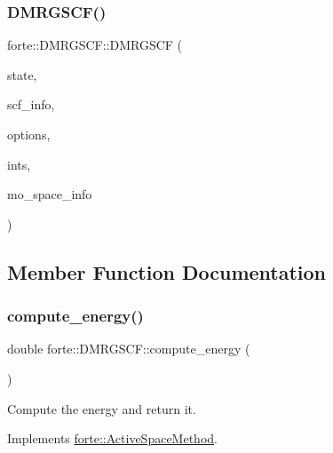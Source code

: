 \subsubsection{\texorpdfstring{D\+M\+R\+G\+S\+C\+F()}{DMRGSCF()}}
{\footnotesize\ttfamily forte\+::\+D\+M\+R\+G\+S\+C\+F\+::\+D\+M\+R\+G\+S\+CF (\begin{DoxyParamCaption}\item[{\mbox{\hyperlink{classforte_1_1_state_info}{State\+Info}}}]{state,  }\item[{std\+::shared\+\_\+ptr$<$ \mbox{\hyperlink{classforte_1_1_s_c_f_info}{S\+C\+F\+Info}} $>$}]{scf\+\_\+info,  }\item[{std\+::shared\+\_\+ptr$<$ \mbox{\hyperlink{classforte_1_1_forte_options}{Forte\+Options}} $>$}]{options,  }\item[{std\+::shared\+\_\+ptr$<$ \mbox{\hyperlink{classforte_1_1_forte_integrals}{Forte\+Integrals}} $>$}]{ints,  }\item[{std\+::shared\+\_\+ptr$<$ \mbox{\hyperlink{classforte_1_1_m_o_space_info}{M\+O\+Space\+Info}} $>$}]{mo\+\_\+space\+\_\+info }\end{DoxyParamCaption})}



\subsection{Member Function Documentation}
\mbox{\label{classforte_1_1_d_m_r_g_s_c_f_a19128db2df6992b295bd00d85c43309d}} 
\subsubsection{\texorpdfstring{compute\+\_\+energy()}{compute\_energy()}}
{\footnotesize\ttfamily double forte\+::\+D\+M\+R\+G\+S\+C\+F\+::compute\+\_\+energy (\begin{DoxyParamCaption}{ }\end{DoxyParamCaption})\hspace{0.3cm}{\ttfamily [virtual]}}



Compute the energy and return it. 



Implements \mbox{\hyperlink{classforte_1_1_active_space_method_a99736e2b94405371b224b0750569b077}{forte\+::\+Active\+Space\+Method}}.

